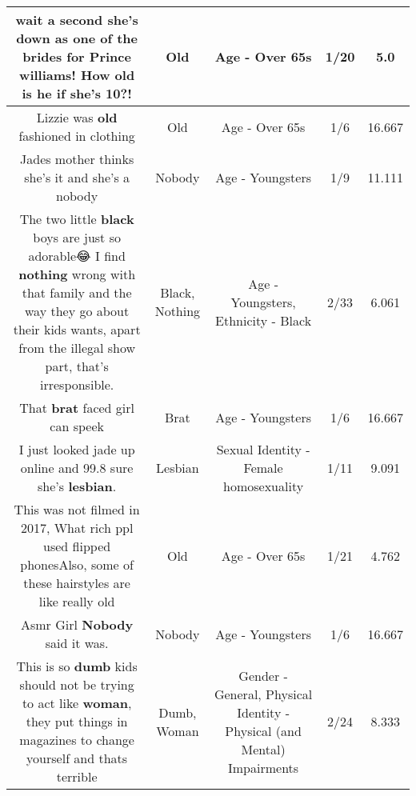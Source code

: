 \documentclass[11pt]{article}
\newlength\mylength
\begin{document}
\begin{center}
\begin{longtable}{|C{.65\mylength}|C{.30\mylength}|C{.12\mylength}|C{.12\mylength}|C{.12\mylength}|}
  \small wait a second she's down as one of the brides for Prince williams! How \textbf{old} is he if she's 10?!\normalsize   & Old & Age - Over 65s & 1/20 & 5.0 \\  \hline
  \small Lizzie was \textbf{old} fashioned in clothing\normalsize   & Old & Age - Over 65s & 1/6 & 16.667 \\  \hline
  \small Jades mother thinks she's it and she's a nobody\normalsize   & Nobody & Age - Youngsters & 1/9 & 11.111 \\  \hline
  \small The two little \textbf{black} boys are just so adorable😂 I find \textbf{nothing} wrong with that family and the way they go about their kids wants, apart from the illegal show part, that's irresponsible.\normalsize   & Black, Nothing & Age - Youngsters, Ethnicity - Black & 2/33 & 6.061 \\  \hline
  \small That \textbf{brat} faced girl can speek\normalsize   & Brat & Age - Youngsters & 1/6 & 16.667 \\  \hline
  \small I just looked jade up online and 99.8 sure she's \textbf{lesbian}.\normalsize   & Lesbian & Sexual Identity - Female homosexuality & 1/11 & 9.091 \\  \hline
  \small This was not filmed in 2017, What rich ppl used flipped phonesAlso, some of these hairstyles are like really old\normalsize   & Old & Age - Over 65s & 1/21 & 4.762 \\  \hline
  \small Asmr Girl \textbf{Nobody} said it was.\normalsize   & Nobody & Age - Youngsters & 1/6 & 16.667 \\  \hline
  \small This is so \textbf{dumb} kids should not be trying to act like \textbf{woman}, they put things in magazines to change yourself and thats terrible\normalsize   & Dumb, Woman & Gender - General, Physical Identity - Physical (and Mental) Impairments & 2/24 & 8.333 \\  \hline

\end{longtable}
\end{center}
\end{document}
